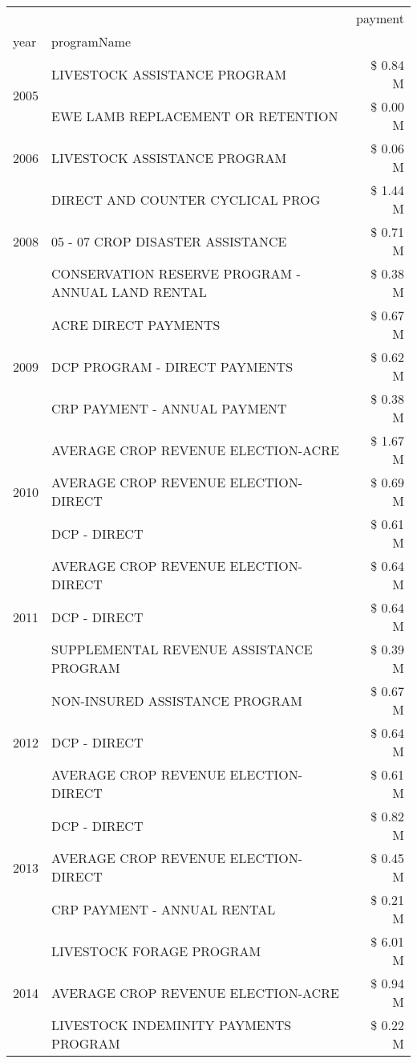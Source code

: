 \begin{tabular}{llr}
\toprule
 &  & payment \\
year & programName &  \\
\midrule
\multirow[t]{2}{*}{2005} & LIVESTOCK ASSISTANCE PROGRAM & \$ 0.84 M \\
 & EWE LAMB REPLACEMENT OR RETENTION & \$ 0.00 M \\
\cline{1-3}
2006 & LIVESTOCK ASSISTANCE PROGRAM & \$ 0.06 M \\
\cline{1-3}
\multirow[t]{3}{*}{2008} & DIRECT AND COUNTER CYCLICAL PROG & \$ 1.44 M \\
 & 05 - 07 CROP DISASTER ASSISTANCE & \$ 0.71 M \\
 & CONSERVATION RESERVE PROGRAM - ANNUAL LAND RENTAL & \$ 0.38 M \\
\cline{1-3}
\multirow[t]{3}{*}{2009} & ACRE DIRECT PAYMENTS & \$ 0.67 M \\
 & DCP PROGRAM - DIRECT PAYMENTS & \$ 0.62 M \\
 & CRP PAYMENT - ANNUAL PAYMENT & \$ 0.38 M \\
\cline{1-3}
\multirow[t]{3}{*}{2010} & AVERAGE CROP REVENUE ELECTION-ACRE & \$ 1.67 M \\
 & AVERAGE CROP REVENUE ELECTION-DIRECT & \$ 0.69 M \\
 & DCP - DIRECT & \$ 0.61 M \\
\cline{1-3}
\multirow[t]{3}{*}{2011} & AVERAGE CROP REVENUE ELECTION-DIRECT & \$ 0.64 M \\
 & DCP - DIRECT & \$ 0.64 M \\
 & SUPPLEMENTAL REVENUE ASSISTANCE PROGRAM & \$ 0.39 M \\
\cline{1-3}
\multirow[t]{3}{*}{2012} & NON-INSURED ASSISTANCE PROGRAM & \$ 0.67 M \\
 & DCP - DIRECT & \$ 0.64 M \\
 & AVERAGE CROP REVENUE ELECTION-DIRECT & \$ 0.61 M \\
\cline{1-3}
\multirow[t]{3}{*}{2013} & DCP - DIRECT & \$ 0.82 M \\
 & AVERAGE CROP REVENUE ELECTION-DIRECT & \$ 0.45 M \\
 & CRP PAYMENT - ANNUAL RENTAL & \$ 0.21 M \\
\cline{1-3}
\multirow[t]{3}{*}{2014} & LIVESTOCK FORAGE PROGRAM & \$ 6.01 M \\
 & AVERAGE CROP REVENUE ELECTION-ACRE & \$ 0.94 M \\
 & LIVESTOCK INDEMINITY PAYMENTS PROGRAM & \$ 0.22 M \\

\end{tabular}
